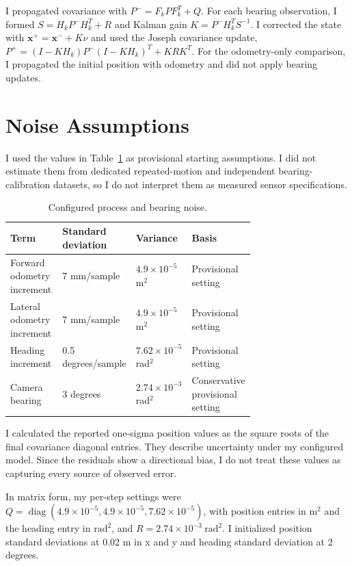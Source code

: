 \documentclass[11pt]{article}
\begin{document}
I propagated covariance with $P^- = F_kPF_k^T+Q$. For each bearing observation, I formed $S=H_kP^-H_k^T+R$ and Kalman gain $K=P^-H_k^TS^{-1}$. I corrected the state with $\mathbf{x}^+=\mathbf{x}^-+K\nu$ and used the Joseph covariance update, $P^+=(I-KH_k)P^-(I-KH_k)^T+KRK^T$. For the odometry-only comparison, I propagated the initial position with odometry and did not apply bearing updates.

\section{Noise Assumptions}
I used the values in Table~\ref{tab:noise} as provisional starting assumptions. I did not estimate them from dedicated repeated-motion and independent bearing-calibration datasets, so I do not interpret them as measured sensor specifications.

\begin{table}[H]
\centering
\caption{Configured process and bearing noise.}
\label{tab:noise}
\begin{tabularx}{\linewidth}{p{0.31\linewidth}p{0.22\linewidth}p{0.18\linewidth}>{\raggedright\arraybackslash}X}
\toprule
Term & Standard deviation & Variance & Basis \\
\midrule
Forward odometry increment & 7 mm/sample & $4.9\times10^{-5}$ m$^2$ & Provisional setting \\
Lateral odometry increment & 7 mm/sample & $4.9\times10^{-5}$ m$^2$ & Provisional setting \\
Heading increment & 0.5 degrees/sample & $7.62\times10^{-5}$ rad$^2$ & Provisional setting \\
Camera bearing & 3 degrees & $2.74\times10^{-3}$ rad$^2$ & Conservative provisional setting \\
\bottomrule
\end{tabularx}
\end{table}

I calculated the reported one-sigma position values as the square roots of the final covariance diagonal entries. They describe uncertainty under my configured model. Since the residuals show a directional bias, I do not treat these values as capturing every source of observed error.

In matrix form, my per-step settings were $Q=\operatorname{diag}(4.9\!\times\!10^{-5},4.9\!\times\!10^{-5},7.62\!\times\!10^{-5})$, with position entries in $\mathrm{m}^2$ and the heading entry in $\mathrm{rad}^2$, and $R=2.74\!\times\!10^{-3}\ \mathrm{rad}^2$. I initialized position standard deviations at 0.02 m in x and y and heading standard deviation at 2 degrees.
\end{document}
